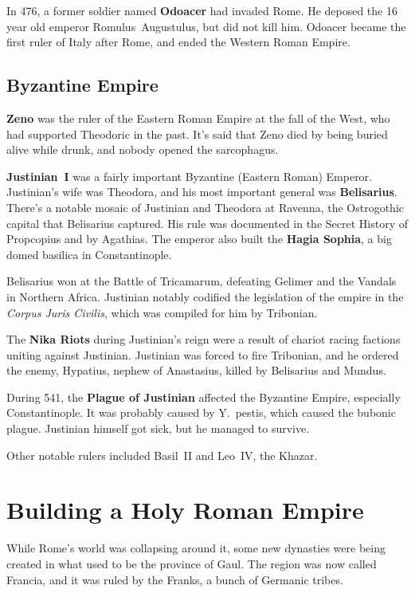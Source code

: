 In 476, a former soldier named \textbf{Odoacer} had invaded Rome.
He deposed the 16 year old emperor Romulus~Augustulus, but did not kill him.
Odoacer became the first ruler of Italy after Rome, and ended the Western Roman Empire.

\subsection*{Byzantine Empire}

\textbf{Zeno} was the ruler of the Eastern Roman Empire at the fall of the West,
who had supported Theodoric in the past.
It's said that Zeno died by being buried alive while drunk, and nobody opened the sarcophagus.

\textbf{Justinian~I} was a fairly important Byzantine (Eastern Roman) Emperor.
Justinian's wife was Theodora, and his most important general was \textbf{Belisarius}.
There's a notable mosaic of Justinian and Theodora at Ravenna,
the Ostrogothic capital that Belisarius captured.
His rule was documented in the Secret History of Propcopius and by Agathias.
The emperor also built the \textbf{Hagia Sophia}, a big domed basilica in Constantinople.

Belisarius won at the Battle of Tricamarum, defeating Gelimer and the Vandals in Northern Africa.
Justinian notably codified the legislation of the empire in the \textit{Corpus Juris Civilis},
which was compiled for him by Tribonian.

The \textbf{Nika Riots} during Justinian's reign were a result of chariot racing factions uniting against Justinian.
Justinian was forced to fire Tribonian,
and he ordered the enemy, Hypatius, nephew of Anastasius, killed by Belisarius and Mundus.

During 541, the \textbf{Plague of Justinian} affected the Byzantine Empire, especially Constantinople.
It was probably caused by Y.\ pestis, which caused the bubonic plague.
Justinian himself got sick, but he managed to survive.

Other notable rulers included Basil~II and Leo~IV, the Khazar.

\section{Building a Holy Roman Empire}

While Rome's world was collapsing around it, some new dynasties were being created
in what used to be the province of Gaul.
The region was now called Francia, and it was ruled by the Franks, a bunch of Germanic tribes.

